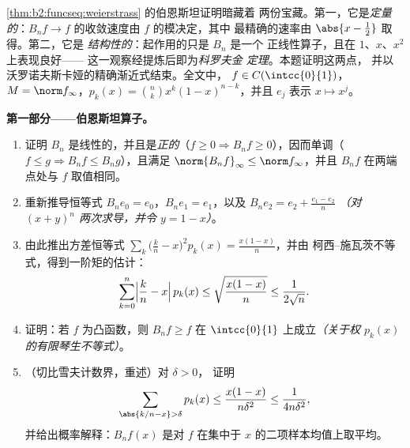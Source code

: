 \begin{problem}\label{pb:b2:funcseq:1}
\cref{thm:b2:funcseq:weierstrass} 的伯恩斯坦证明暗藏着
两份宝藏。第一，它是\emph{定量的}：$B_nf
\to f$ 的收敛速度由 $f$ 的模决定，其中
最精确的速率由 $\abs{x - \frac12}$ 取得。第二，它是
\emph{结构性的}：起作用的只是 $B_n$ 是一个
正线性算子，且在 $1$、$x$、$x^2$ 上表现良好——
这一观察经提炼后即为\emph{科罗夫金
定理}。本题证明这两点，
并以沃罗诺夫斯卡娅的精确渐近式结束。全文中，
$f \in C(\intcc{0}{1})$，$M = \norm f_\infty$，$p_k(x) = \binom
nk x^k(1-x)^{n-k}$，并且 $e_j$ 表示 $x \mapsto x^j$。

\medskip
\noindent\textbf{第一部分——伯恩斯坦算子。}
\begin{enumerate}
  \item 证明 $B_n$ 是线性的，并且是\emph{正的}（$f \geq 0
        \Rightarrow B_nf \geq 0$），因而单调（$f \leq g
        \Rightarrow B_nf \leq B_ng$），且满足
        $\norm{B_nf}_\infty \leq \norm f_\infty$，并且
        $B_nf$ 在两端点处与 $f$ 取值相同。
  \item 重新推导恒等式 $B_n e_0 = e_0$，$B_n e_1 =
        e_1$，以及 $B_n e_2 = e_2 + \frac{e_1 - e_2}{n}$
        \emph{（对 $(x + y)^n$ 两次求导，并令 $y = 1 -
        x$）}。
  \item 由此推出方差恒等式 $\sum_k \bigl(\frac kn -
        x\bigr)^2 p_k(x) = \frac{x(1-x)}{n}$，并由
        柯西–施瓦茨不等式，得到一阶矩的估计：
        \[
        \sum_{k=0}^{n}\Bigl|\frac kn - x\Bigr|\,p_k(x)
        \leq \sqrt{\frac{x(1-x)}{n}} \leq \frac{1}{2\sqrt n} .
        \]
  \item 证明：若 $f$ 为凸函数，则 $B_nf \geq f$ 在
        $\intcc{0}{1}$ 上成立\emph{（关于权
        $p_k(x)$ 的有限琴生不等式）}。
  \item （切比雪夫计数界，重述）对 $\delta > 0$，
        证明
        \[
        \sum_{\abs{k/n - x} > \delta} p_k(x)
        \leq \frac{x(1-x)}{n\delta^2}
        \leq \frac{1}{4n\delta^2} ,
        \]
        并给出概率解释：$B_nf(x)$ 是对
        $f$ 在集中于 $x$ 的二项样本均值上取平均。
\end{enumerate}


\end{problem}

